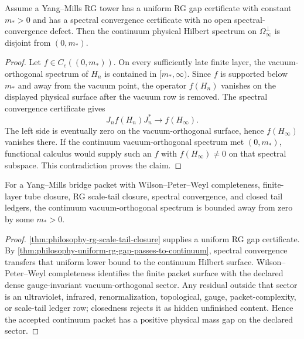 \begin{theorem}
\label{thm:philosophy-uniform-rg-gap-passes-to-continuum}
Assume a Yang--Mills RG tower has a uniform RG gap certificate with constant
$m_{\ast}>0$ and has a spectral convergence certificate with no open
spectral-convergence defect. Then the continuum physical Hilbert spectrum on
$\Omega_{\infty}^{\perp}$ is disjoint from $(0,m_{\ast})$.
\end{theorem}
\begin{proof}
Let $f\in C_c((0,m_{\ast}))$. On every sufficiently late finite layer, the
vacuum-orthogonal spectrum of $H_n$ is contained in $[m_{\ast},\infty)$.
Since $f$ is supported below $m_{\ast}$ and away from the vacuum point, the
operator $f(H_n)$ vanishes on the displayed physical surface after the
vacuum row is removed. The spectral convergence certificate gives
$$
J_n f(H_n)J_n^{\ast}\longrightarrow f(H_{\infty}).
$$
The left side is eventually zero on the vacuum-orthogonal surface, hence
$f(H_{\infty})$ vanishes there. If the continuum vacuum-orthogonal spectrum
met $(0,m_{\ast})$, functional calculus would supply such an $f$ with
$f(H_{\infty})\ne0$ on that spectral subspace. This contradiction proves the
claim.
\end{proof}

\begin{corollary}
\label{cor:philosophy-rg-scale-tail-closure-continuum-gap-route}
For a Yang--Mills bridge packet with Wilson--Peter--Weyl completeness,
finite-layer tube closure, RG scale-tail closure, spectral convergence, and
closed tail ledgers, the continuum vacuum-orthogonal spectrum is bounded
away from zero by some $m_{\ast}>0$.
\end{corollary}
\begin{proof}
\autoref{thm:philosophy-rg-scale-tail-closure} supplies a uniform RG gap
certificate. By
\autoref{thm:philosophy-uniform-rg-gap-passes-to-continuum}, spectral
convergence transfers that uniform lower bound to the continuum Hilbert
surface. Wilson--Peter--Weyl completeness identifies the finite packet
surface with the declared dense gauge-invariant vacuum-orthogonal sector.
Any residual outside that sector is an ultraviolet, infrared,
renormalization, topological, gauge, packet-complexity, or scale-tail ledger
row; closedness rejects it as hidden unfinished content. Hence the accepted
continuum packet has a positive physical mass gap on the declared sector.
\end{proof}

